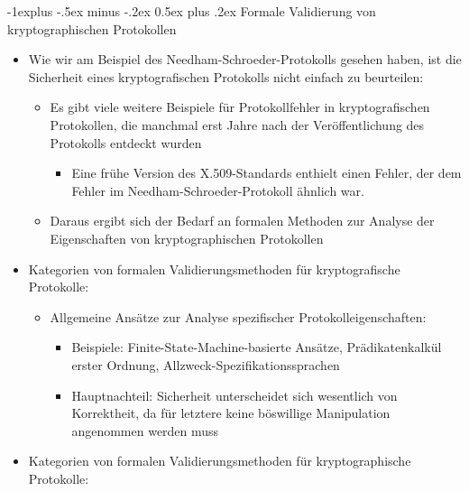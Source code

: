\documentclass[a4paper]{article}
\makeatletter
\renewcommand{\subsection}{\@startsection{subsection}{2}{0mm}%
 {-1explus -.5ex minus -.2ex}%
 {0.5ex plus .2ex}%
 {\normalfont\normalsize\bfseries}}
\makeatother
\begin{document}
\begin{multicols}{3}
    \subsection{Formale Validierung von kryptographischen
        Protokollen}

    \begin{itemize}
        \item
              Wie wir am Beispiel des Needham-Schroeder-Protokolls gesehen haben,
              ist die Sicherheit eines kryptografischen Protokolls nicht einfach zu
              beurteilen:

              \begin{itemize}
                  \item
                        Es gibt viele weitere Beispiele für Protokollfehler in
                        kryptografischen Protokollen, die manchmal erst Jahre nach der
                        Veröffentlichung des Protokolls entdeckt wurden

                        \begin{itemize}
                            \item
                                  Eine frühe Version des X.509-Standards enthielt einen Fehler, der
                                  dem Fehler im Needham-Schroeder-Protokoll ähnlich war.
                        \end{itemize}
                  \item
                        Daraus ergibt sich der Bedarf an formalen Methoden zur Analyse der
                        Eigenschaften von kryptographischen Protokollen
              \end{itemize}
        \item
              Kategorien von formalen Validierungsmethoden für kryptografische
              Protokolle:

              \begin{itemize}
                  \item
                        Allgemeine Ansätze zur Analyse spezifischer Protokolleigenschaften:

                        \begin{itemize}
                            \item
                                  Beispiele: Finite-State-Machine-basierte Ansätze, Prädikatenkalkül
                                  erster Ordnung, Allzweck-Spezifikationssprachen
                            \item
                                  Hauptnachteil: Sicherheit unterscheidet sich wesentlich von
                                  Korrektheit, da für letztere keine böswillige Manipulation
                                  angenommen werden muss
                        \end{itemize}
              \end{itemize}
        \item
              Kategorien von formalen Validierungsmethoden für kryptographische
              Protokolle:


\end{itemize}
\end{multicols}
\end{document}
